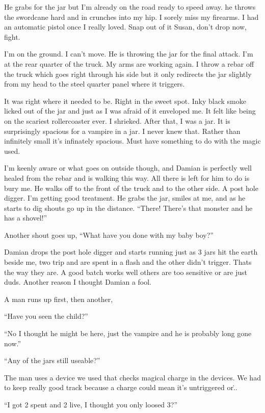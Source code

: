 He grabs for the jar but I'm already on the road ready to speed away. he throws the swordcane hard and in crunches into my hip. I sorely miss my firearms. I had an automatic pistol once I really loved. Snap out of it Susan, don't drop now, fight.

I'm on the ground. I can't move. He is throwing the jar for the final attack. I'm at the rear quarter of the truck. My arms are working again. I throw a rebar off the truck which goes right through his side but it only redirects the jar slightly from my head to the steel quarter panel where it triggers.

It was right where it needed to be. Right in the sweet spot. Inky black smoke licked out of the jar and just as I was afraid of it enveloped me. It felt like being on the scariest rollercoaster ever. I shrieked. After that, I was a jar. It is surprisingly spacious for a vampire in a jar. I never knew that. Rather than infinitely small it's infinately spacious. Must have something to do with the magic used.

I'm keenly aware or what goes on outside though, and Damian is perfectly well healed from the rebar and is walking this way. All there is left for him to do is bury me. He walks off to the front of the truck and to the other side. A post hole digger. I'm getting good treatment. He grabs the jar, smiles at me, and as he starts to dig shouts go up in the distance. ``There! There's that monster and he has a shovel!''

Another shout goes up, ``What have you done with my baby boy?''

Damian drops the post hole digger and starts running just as 3 jars hit the earth beside me, two trip and are spent in a flash and the other didn't trigger. Thats the way they are. A good batch works well others are too sensitive or are just duds. Another reason I thought Damian a fool.

A man runs up first, then another, 

``Have you seen the child?''

``No I thought he might be here, just the vampire and he is probably long gone now.''

``Any of the jars still useable?''

The man uses a device we used that checks magical charge in the devices. We had to keep really good track because a charge could mean it's untriggered or\...

``I got 2 spent and 2 live, I thought you only loosed 3?''

